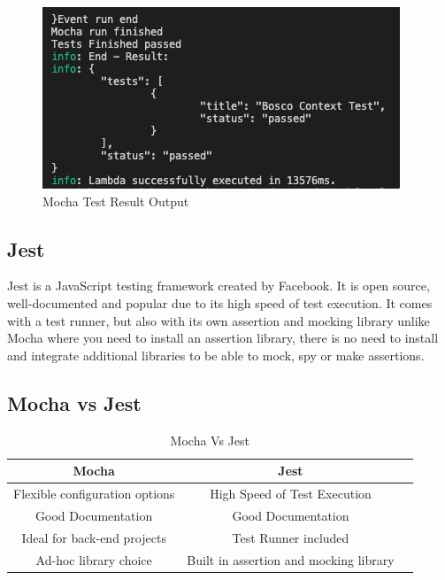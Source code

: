 \documentclass[12pt,a4paper,titlepage]{report}
\begin{document}
\begin{figure}[ht]
 \centering
 \includegraphics[width=\textwidth,height=\textheight,keepaspectratio]{./diagrams/mocha_test_result.png}
 \caption{Mocha Test Result Output}
\end{figure}

\subsection{Jest}

Jest is a JavaScript testing framework created by Facebook. It is open source, well-documented and popular due to its
high speed of test execution. It comes with a test runner, but also with its own assertion and mocking library unlike Mocha where you need to install an assertion
library, there is no need to install and integrate additional libraries to be able to mock, spy or make assertions.

\subsection{Mocha vs Jest}

\begin{table}[H]
 \centering
 \small
 \setlength\tabcolsep{6pt}
 \begin{tabular}{|c|c|c}
  \hline \textbf
  {Mocha}       & \textbf {Jest}\\
  \hline\hline
  Flexible configuration options & High Speed of Test Execution\\
  \hline
  Good Documentation       & Good Documentation\\
  \hline
  Ideal for back-end projects  & Test Runner included\\
  \hline
  Ad-hoc library choice     & Built in assertion and mocking library\\
  \hline
 \end{tabular}
 \caption{Mocha Vs Jest}
\label{table:mocha:jest}
\end{table}
\end{document}

